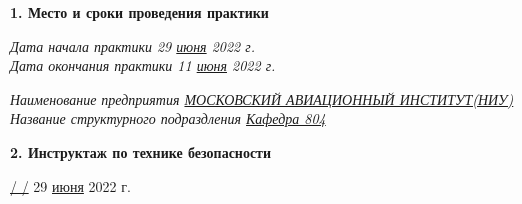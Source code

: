 \textbf{1. Место и сроки проведения практики}

\vspace{20pt}

{\em Дата начала практики \hspace{3cm} 29 \underline{июня} 2022 г.} \\

{\em Дата окончания практики \hspace{3cm} 11 \underline{июня} 2022 г.}

\vspace{20pt}

{\em Наименование предприятия \underline{МОСКОВСКИЙ АВИАЦИОННЫЙ ИНСТИТУТ(НИУ)}} \\

{\em Название структурного подраздления \underline{Кафедра 804}}

\vspace{20pt}

\textbf{2. Инструктаж по технике безопасности}

\vspace{10pt}

\underline{ \hspace{3cm} / \hspace{3cm} /} \hspace{1cm} 29 \underline{июня} 2022 г.

\pagebreak
